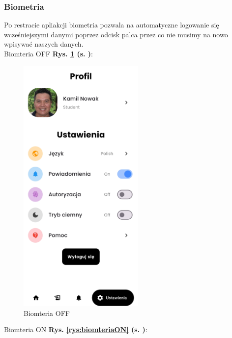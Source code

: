 \subsubsection{Biometria}
Po restracie apliakcji biometria pozwala na automatyczne logowanie się wcześniejszymi danymi poprzez odcisk palca przez co nie musimy na nowo wpisywać naszych danych.
\\Biomteria OFF \textbf{Rys. \ref{rys:biomteriaOFF} (s. \pageref{rys:biomteriaOFF})}:
\begin{figure}[h!]
	\centering
	\includegraphics[width=0.55\textwidth]{rys/biometrics_off.png}
	\caption{Biomteria OFF}
	\label{rys:biomteriaOFF}
\end{figure}
\newpage
Biomteria ON \textbf{Rys. \ref{rys:biomteriaON} (s. \pageref{rys:biomteriaON})}:
